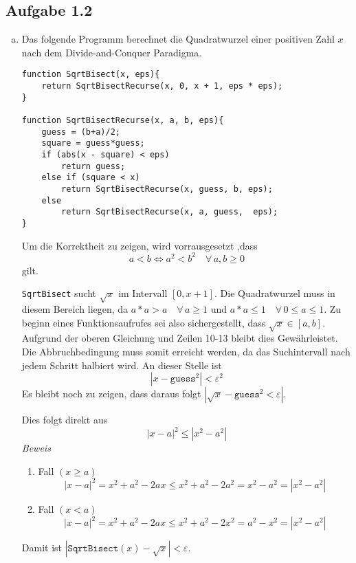 \documentclass[11pt]{article}
\newcommand{\abs}[1]{\left| #1 \right| }
\begin{document}
\subsection*{Aufgabe 1.2}
\begin{enumerate}[a)]
  \item 
    Das folgende Programm berechnet die Quadratwurzel einer positiven 
    Zahl $x$ nach dem Divide-and-Conquer Paradigma. 


    \begin{lstlisting}
function SqrtBisect(x, eps){
    return SqrtBisectRecurse(x, 0, x + 1, eps * eps);
}

function SqrtBisectRecurse(x, a, b, eps){
    guess = (b+a)/2;
    square = guess*guess;
    if (abs(x - square) < eps)
        return guess;
    else if (square < x)
        return SqrtBisectRecurse(x, guess, b, eps);
    else
        return SqrtBisectRecurse(x, a, guess,  eps);
}
  \end{lstlisting}

  Um die Korrektheit zu zeigen, wird vorrausgesetzt ,dass  
  \begin{equation}
    a < b \iff a^2 < b^2 \quad\forall\, a, b \ge 0
  \end{equation}
  gilt.

  \texttt{SqrtBisect} sucht $\sqrt{x}$ im Intervall $[0,x+1]$. Die Quadratwurzel
  muss in diesem Bereich liegen, da $a * a > a \quad\forall\, a \ge 1 $ und
  $a * a \le 1 \quad\forall\, 0 \le a \le 1$.
  Zu beginn eines Funktionsaufrufes sei also sichergestellt, dass $\sqrt{x} \in
  [a,b]$.  Aufgrund der oberen Gleichung und Zeilen 10-13 bleibt dies
  Gew\"ahrleistet. Die Abbruchbedingung muss somit erreicht werden, da das
  Suchintervall nach jedem Schritt halbiert wird. An dieser Stelle ist
  \begin{equation}
  | x - \texttt{guess}^2 | < \varepsilon^2
  \end{equation}
  Es bleibt noch zu zeigen, dass daraus folgt $\left| \sqrt{x} - \texttt{guess}^2
  < \varepsilon \right|$.

  Dies folgt direkt aus \[ \left| x-a \right|^2 \le \left| x^2 - a^2 \right|  \]  
  \emph{Beweis} \\
  \begin{enumerate}
    \item Fall $(x \ge a)$
      \[ \abs{x-a}^2 = x^2 + a^2 - 2 ax \le x^2 + a^2 - 2 a^2 = x^2 -a^2 =
      \abs{x^2-a^2}  \] 
    \item Fall $(x < a)$
      \[ \abs{x-a}^2 = x^2 + a^2 - 2 ax \le x^2 + a^2 - 2 x^2 = a^2 -x^2 =
      \abs{x^2-a^2}  \] 
  \end{enumerate}
  Damit ist $\abs{ \texttt{SqrtBisect}(x)- \sqrt{x} } < \varepsilon$.




\end{enumerate}
\end{document}

